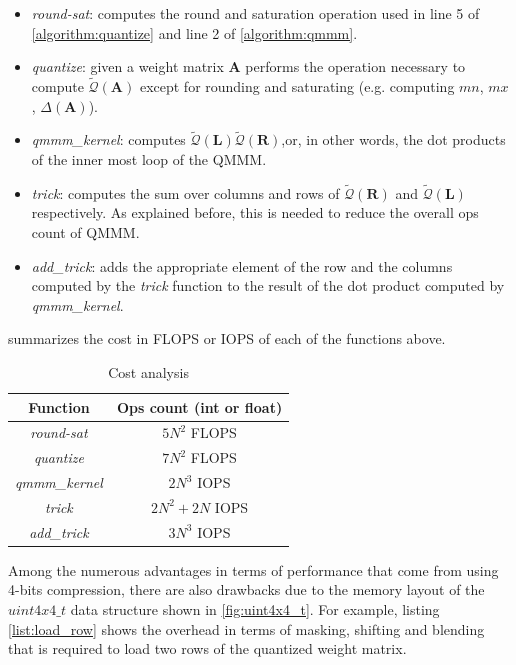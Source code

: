 \begin{itemize}
\item \emph{round-sat}: computes the round and saturation operation used in line 5 of \cref{algorithm:quantize} and line 2 of \cref{algorithm:qmmm}.
\item \emph{quantize}: given a weight matrix $\mathbf{A}$ performs the operation necessary to compute  $\tilde{\mathcal{Q}}(\mathbf{A}) $ except for rounding and saturating (e.g. computing $mn$, $mx$, $\Delta(\mathbf{A})$).
\item \emph{qmmm\_kernel}: computes $ \tilde{\mathcal{Q}}(\mathbf{L}) \tilde{\mathcal{Q}}(\mathbf{R})$,or, in other words, the dot products of the inner most loop of the QMMM.
\item \emph{trick}: computes the sum over columns and rows of $\tilde{\mathcal{Q}}(\mathbf{R})$ and $\tilde{\mathcal{Q}}(\mathbf{L})$ respectively. As explained before, this is needed to reduce the overall ops count of QMMM. 
\item \emph{add\_trick}: adds the appropriate element of the row and the columns computed by the \emph{trick} function to the result of the dot product computed by \emph{qmmm\_kernel}.
\end{itemize}
 summarizes the cost in FLOPS or IOPS of each of the functions above.

\begin{table}
\centering
\begin{tabular}{ c|c } 
 
 Function & Ops count (int or float) \\
 \hline 
 \emph{round-sat} & $5N^2$ FLOPS \\
\emph{quantize} & $7N^2$ FLOPS \\
\emph{qmmm\_kernel} & $2N^3$ IOPS \\
\emph{trick} & $2N^2 + 2N$ IOPS \\
\emph{add\_trick} & $3N^3$ IOPS \\
 \end{tabular}
  \caption{Cost analysis}
\label{tab:cost} 
\end{table}

Among the numerous advantages in terms of performance that come from using 4-bits compression, there are also drawbacks due to the memory layout of the $uint4x4\_t$ data structure shown in \cref{fig:uint4x4_t}. For example, listing \ref{list:load_row} shows the overhead in terms of masking, shifting and blending that is required to load two rows of the quantized weight matrix.

